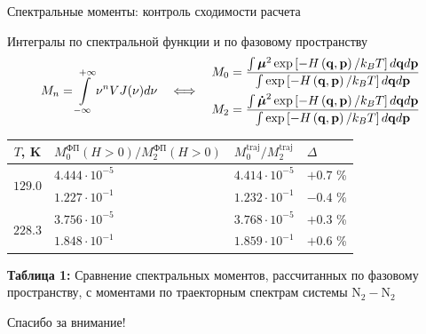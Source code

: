 \documentclass[10pt,usenames,pdf,hyperref={unicode},dvipsnames]{beamer}
\newcommand{\lb}{\left(}
\newcommand{\rb}{\right)}
\newcommand{\lsq}{\left[}
\newcommand{\rsq}{\right]}
\newcommand{\mf}{\mathbf}
\newcommand{\mycaption}[2]{
    \textbf{#1:} #2
}
\begin{document}
\begin{frame}{\hspace*{-0.3cm}Спектральные моменты: контроль сходимости расчета}
    \vspace*{-0.3cm}
    \begin{block}{{\normalsize Интегралы по спектральной функции и по фазовому пространству}}
        \vspace*{-0.6cm}
        \begin{gather}
            M_n = \int\limits_{-\infty}^{+\infty} \nu^n VJ(\nu) d\nu \quad \Longleftrightarrow \quad 
            \begin{aligned}
                M_0 = \frac{\int \boldsymbol{\mu}^2 \exp \lsq -H \lb \mf{q}, \mf{p} \rb / k_B T \rsq d \mf{q} d\mf{p} }{\int \exp \lsq -H \lb \mf{q}, \mf{p}\rb / k_B T \rsq d \mf{q} d\mf{p} } \\
                M_2 = \frac{\int \boldsymbol{\dot{\mu}}^2 \exp \lsq -H \lb \mf{q}, \mf{p}\rb / k_B T \rsq d \mf{q} d\mf{p}}{\int \exp \lsq -H \lb \mf{q}, \mf{p} \rb / k_B T \rsq d \mf{q} d\mf{p} } 
            \end{aligned} \notag
        \end{gather}
    \end{block}

    \vspace*{-0.7cm}
    \begin{table}[H]
            \begin{tabular}{c >{\centering}p{5cm} >{\centering}p{2cm} >{\centering}p{2cm}}
            \toprule
            $T$, K & $M_0^\text{ФП}(H > 0) / M_2^\text{ФП} (H > 0)$  & $M_0^\text{traj} / M_2^\text{traj}$ & $\Delta$ \tabularnewline
            \midrule
            \multirow{2}{*}{$129.0$} & $4.444\cdot 10^{-5}$ & $4.414 \cdot 10^{-5}$ & $+0.7$ \%  \tabularnewline
                                     & $1.227\cdot 10^{-1}$ & $1.232 \cdot 10^{-1}$ & $-0.4$ \%  \tabularnewline
                                     \midrule
            \multirow{2}{*}{$228.3$} & $3.756\cdot 10^{-5}$ & $3.768 \cdot 10^{-5}$ & $+0.3$ \%  \tabularnewline
                                     & $1.848\cdot 10^{-1}$ & $1.859 \cdot 10^{-1}$ & $+0.6$ \%  \tabularnewline
                                     \midrule
        \end{tabular}
        \mycaption{Таблица 1}{Сравнение спектральных моментов, рассчитанных по фазовому пространству, с моментами по траекторным спектрам системы N$_2-$N$_2$}
        \label{table:n2n2-moments}
    \end{table}
\end{frame}


\begin{frame}{}
    \centering
    {\Huge Спасибо за внимание!}
\end{frame}
\end{document}
